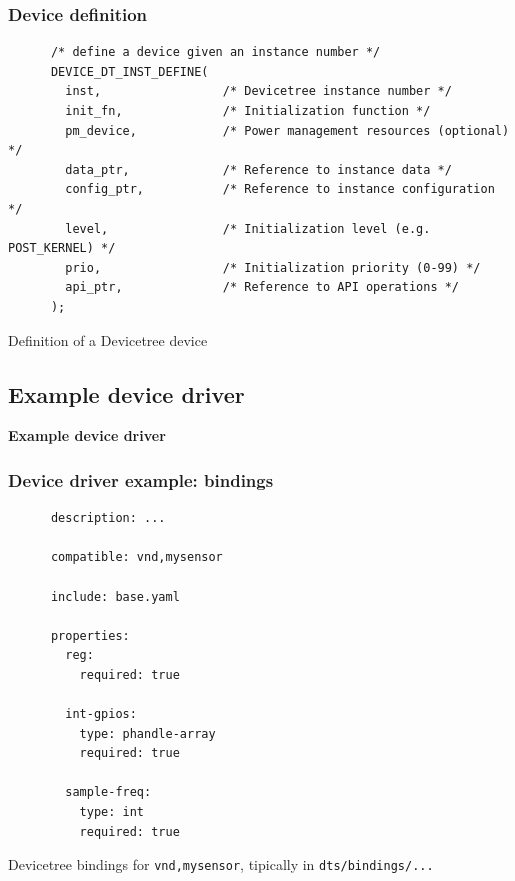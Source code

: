 \documentclass[handout]{beamer}
\begin{document}
\begin{frame}[fragile]
  \frametitle{Device definition}
  \begin{listing}[H]
    \begin{verbatim}
      /* define a device given an instance number */
      DEVICE_DT_INST_DEFINE(
        inst,                 /* Devicetree instance number */
        init_fn,              /* Initialization function */
        pm_device,            /* Power management resources (optional) */
        data_ptr,             /* Reference to instance data */
        config_ptr,           /* Reference to instance configuration */
        level,                /* Initialization level (e.g. POST_KERNEL) */
        prio,                 /* Initialization priority (0-99) */
        api_ptr,              /* Reference to API operations */
      );
    \end{verbatim}
    \caption{Definition of a Devicetree device\footnotemark}
  \end{listing}

\end{frame}

\subsection{Example device driver}

\begin{frame}
  \begin{center}
    \Large \textbf{Example device driver}
  \end{center}
\end{frame}

\begin{frame}[fragile]
  \frametitle{Device driver example: bindings}

  \begin{listing}[H]
    \begin{verbatim}
      description: ...

      compatible: vnd,mysensor

      include: base.yaml

      properties:
        reg:
          required: true

        int-gpios:
          type: phandle-array
          required: true

        sample-freq:
          type: int
          required: true
    \end{verbatim}
    \caption{Devicetree bindings for \texttt{vnd,mysensor}, tipically in
      \texttt{dts/bindings/...}}
  \end{listing}
\end{frame}
\end{document}
